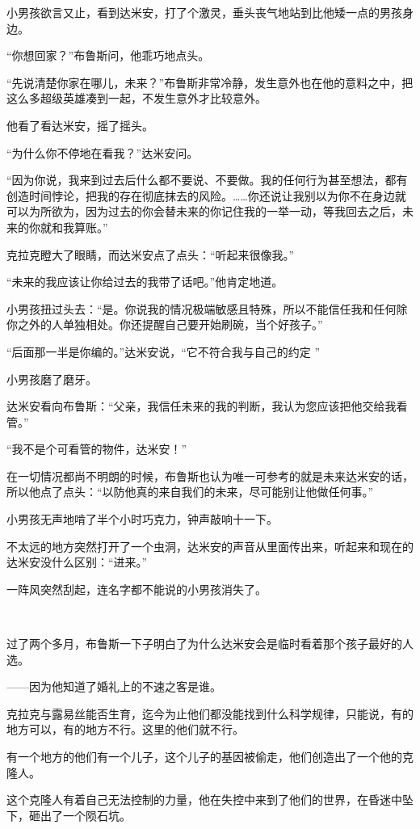 \documentclass[../main]{subfiles}
\begin{document}
小男孩欲言又止，看到达米安，打了个激灵，垂头丧气地站到比他矮一点的男孩身边。

“你想回家？”布鲁斯问，他乖巧地点头。

“先说清楚你家在哪儿，未来？”布鲁斯非常冷静，发生意外也在他的意料之中，把这么多超级英雄凑到一起，不发生意外才比较意外。

他看了看达米安，摇了摇头。

“为什么你不停地在看我？”达米安问。

“因为你说，我来到过去后什么都不要说、不要做。我的任何行为甚至想法，都有创造时间悖论，把我的存在彻底抹去的风险。……你还说让我别以为你不在身边就可以为所欲为，因为过去的你会替未来的你记住我的一举一动，等我回去之后，未来的你就和我算账。”

克拉克瞪大了眼睛，而达米安点了点头：“听起来很像我。”

“未来的我应该让你给过去的我带了话吧。”他肯定地道。

小男孩扭过头去：“是。你说我的情况极端敏感且特殊，所以不能信任我和任何除你之外的人单独相处。你还提醒自己要开始刷碗，当个好孩子。”

“后面那一半是你编的。”达米安说，“它不符合我与自己的约定 ”

小男孩磨了磨牙。

达米安看向布鲁斯：“父亲，我信任未来的我的判断，我认为您应该把他交给我看管。”

“我不是个可看管的物件，达米安！”

在一切情况都尚不明朗的时候，布鲁斯也认为唯一可参考的就是未来达米安的话，所以他点了点头：“以防他真的来自我们的未来，尽可能别让他做任何事。”

小男孩无声地啃了半个小时巧克力，钟声敲响十一下。

不太远的地方突然打开了一个虫洞，达米安的声音从里面传出来，听起来和现在的达米安没什么区别：“进来。”

一阵风突然刮起，连名字都不能说的小男孩消失了。

~\

过了两个多月，布鲁斯一下子明白了为什么达米安会是临时看着那个孩子最好的人选。

——因为他知道了婚礼上的不速之客是谁。

克拉克与露易丝能否生育，迄今为止他们都没能找到什么科学规律，只能说，有的地方可以，有的地方不行。这里的他们就不行。

有一个地方的他们有一个儿子，这个儿子的基因被偷走，他们创造出了一个他的克隆人。

这个克隆人有着自己无法控制的力量，他在失控中来到了他们的世界，在昏迷中坠下，砸出了一个陨石坑。
\end{document}
